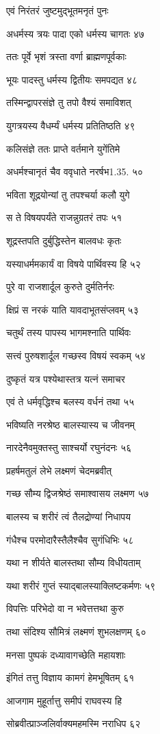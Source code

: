 एवं निरंतरं जुष्टमुद्भूतमनृतं पुनः

अधर्मस्य त्रयः पादा एको धर्मस्य चागतः ४७

ततः पूर्वे भृशं त्रस्ता वर्णा ब्राह्मणपूर्वकाः

भूयः पादस्तु धर्मस्य द्वितीयः समपद्यत ४८

तस्मिन्द्वापरसंज्ञे तु तपो वैश्यं समाविशत्

युगत्रयस्य वैधर्म्यं धर्मस्य प्रतितिष्ठति ४९

कलिसंज्ञे ततः प्राप्ते वर्तमाने युगेंतिमे

अधर्मश्चानृतं चैव ववृधाते नरर्षभ1.35. ५०

भविता शूद्रयोन्यां तु तपश्चर्या कलौ युगे

स ते विषयपर्यंते राजन्नुग्रतरं तपः ५१

शूद्रस्तपति दुर्बुद्धिस्तेन बालवधः कृतः

यस्याधर्ममकार्यं वा विषये पार्थिवस्य हि ५२

पुरे वा राजशार्दूल कुरुते दुर्मतिर्नरः

क्षिप्रं स नरकं याति यावदाभूतसंप्लवम् ५३

चतुर्थं तस्य पापस्य भागमश्नाति पार्थिवः

सत्त्वं पुरुषशार्दूल गच्छस्व विषयं स्वकम् ५४

दुष्कृतं यत्र पश्येथास्तत्र यत्नं समाचर

एवं ते धर्मवृद्धिश्च बलस्य वर्धनं तथा ५५

भविष्यति नरश्रेष्ठ बालस्यास्य च जीवनम्

नारदेनैवमुक्तस्तु साश्चर्यो रघुनंदनः ५६

प्रहर्षमतुलं लेभे लक्ष्मणं चेदमब्रवीत्

गच्छ सौम्य द्विजश्रेष्ठं समाश्वासय लक्ष्मण ५७

बालस्य च शरीरं त्वं तैलद्रोण्यां निधापय

गंधैश्च परमोदारैस्तैलैश्चैव सुगंधिभिः ५८

यथा न शीर्यते बालस्तथा सौम्य विधीयताम्

यथा शरीरं गुप्तं स्याद्बालस्याक्लिष्टकर्मणः ५९

विपत्तिः परिभेदो वा न भवेत्तत्तथा कुरु

तथा संदिश्य सौमित्रं लक्ष्मणं शुभलक्षणम् ६०

मनसा पुष्पकं दध्यावागच्छेति महायशाः

इंगितं तत्तु विज्ञाय कामगं हेमभूषितम् ६१

आजगाम मुहूर्तात्तु समीपं राघवस्य हि

सोब्रवीत्प्राञ्जलिर्वाक्यमहमस्मि नराधिप ६२

